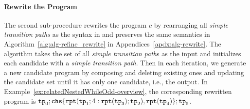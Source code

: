 \paragraph{Rewrite the Program}
The second sub-procedure rewrites the program $c$ by rearranging all \emph{simple transition paths} as the syntax in \cite{GulwaniJK09} and preserves the same semantics in Algorithm~\ref{alg:alg-refine_rewrite} in Appendices~\ref{apdx:alg-rewrite}.
The algorithm takes  the set of all \emph{simple transition path}s as the input and initializes each candidate with a \emph{simple transition path}.
Then in each iteration, we generate a new candidate program by composing and deleting existing ones and updating the candidate set until it has only one candidate, i.e., the output.
%
In Example~\ref{ex:relatedNestedWhileOdd-overview}, the corresponding rewritten program is
$ 
\tpath_0; \rpchoose{\rprepeat(\tpath_1; 4:\rprepeat(\tpath_3); \tpath_2),\rprepeat(\tpath_4) }; \tpath_5
$.

